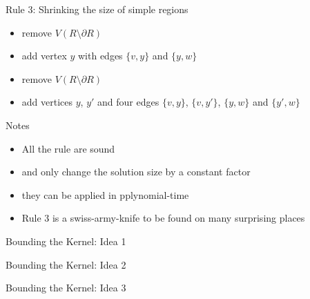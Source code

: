 \begin{frame}[c]{Rule 3: Shrinking the size of simple regions}

    \begin{caseof}

            \begin{itemize}
                    \item remove $V(R\setminus\partial R)$
                    \item add vertex $y$ with edges $\{v, y\}$ and $\{y, w\}$
            \end{itemize}
        {\bfseries

            \begin{itemize}
                    \item remove $V(R\setminus\partial R)$
                    \item add vertices $y$, $y'$ and four edges $\{v,y\}$, $\{v, y'\}$, $\{y, w\}$ and $\{y', w\}$
            \end{itemize}
        }
        \end{caseof}

    \begin{figure}[!ht]
    \end{figure}
\end{frame}


\begin{frame}[c]{Notes}
    \begin{itemize}
        \item All the rule are sound 
        \item and only change the solution size by a constant factor
        \item they can be applied in pplynomial-time
        \item Rule 3 is a swiss-army-knife to be found on many surprising places
    \end{itemize}
\end{frame}

\begin{frame}[c]{Bounding the Kernel: Idea 1}
    \begin{figure}[!ht]
    \end{figure}
\end{frame}
\begin{frame}[c]{Bounding the Kernel: Idea 2}

    \begin{figure}[!ht]
    \end{figure}
\end{frame}
\begin{frame}[c]{Bounding the Kernel: Idea 3}

    \begin{figure}[!ht]
    \end{figure}
\end{frame}

